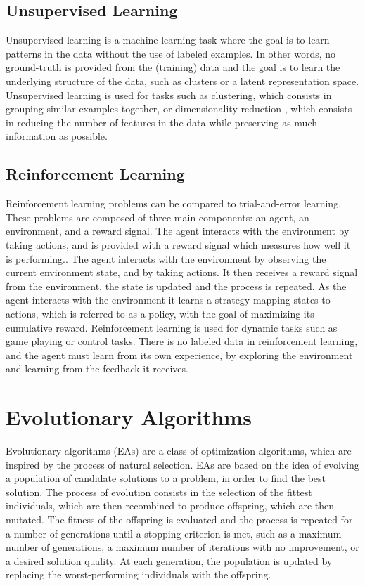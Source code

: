 \subsection{Unsupervised Learning}

Unsupervised learning \cite{unsupervised_learning} is a machine learning task where the goal is to learn patterns in the data without the use of labeled examples.
In other words, no ground-truth is provided from the (training) data and the goal is to learn the underlying structure of the data, such as clusters or a latent
representation space. Unsupervised learning is used for tasks such as clustering, which consists in grouping similar examples together, or dimensionality reduction
\cite{dimensionality_review,dimensionality_survey}, which consists in reducing the number of features in the data while preserving as much information as possible.

\subsection{Reinforcement Learning}

Reinforcement learning problems \cite{rl_survey} can be compared to trial-and-error learning. These problems are composed of three main components: an agent, an environment, and a reward
signal. The agent interacts with the environment by taking actions, and is provided with a reward signal which measures how well it is performing.. The agent interacts with
the environment by observing the current environment state, and by taking actions. It then receives a reward signal from the environment, the state is updated and the process is repeated.
As the agent interacts with the environment it learns a strategy mapping states to actions, which is referred to as a policy, with the goal of maximizing its cumulative reward.
Reinforcement learning is used for dynamic tasks such as game playing or control tasks.
There is no labeled data in reinforcement learning, and the agent must learn from its own experience, by exploring the environment and learning from the feedback it receives.

\section{Evolutionary Algorithms}

Evolutionary algorithms (EAs) are a class of optimization algorithms, which are inspired by the process of natural selection. EAs are based on the idea of
evolving a population of candidate solutions to a problem, in order to find the best solution. The process of evolution consists in the selection of the
fittest individuals, which are then recombined to produce offspring, which are then mutated. The fitness of the offspring is evaluated and the process is
repeated for a number of generations until a stopping criterion is met, such as a maximum number of generations, a maximum number of iterations with no improvement,
or a desired solution quality. At each generation, the population is updated by replacing the worst-performing individuals with the offspring.


